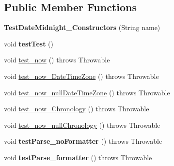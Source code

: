\subsection*{Public Member Functions}
\begin{DoxyCompactItemize}
\item 
\hypertarget{classorg_1_1joda_1_1time_1_1_test_date_midnight___constructors_a6449ea2c77ab4e7d8cbd9c25c146fb81}{{\bfseries Test\-Date\-Midnight\-\_\-\-Constructors} (String name)}\label{classorg_1_1joda_1_1time_1_1_test_date_midnight___constructors_a6449ea2c77ab4e7d8cbd9c25c146fb81}

\item 
\hypertarget{classorg_1_1joda_1_1time_1_1_test_date_midnight___constructors_ab89e65577a08456df32a58e4eb211a2d}{void {\bfseries test\-Test} ()}\label{classorg_1_1joda_1_1time_1_1_test_date_midnight___constructors_ab89e65577a08456df32a58e4eb211a2d}

\item 
void \hyperlink{classorg_1_1joda_1_1time_1_1_test_date_midnight___constructors_ae6c970f78e4b58bfa515afb75dac4915}{test\-\_\-now} ()  throws Throwable 
\item 
void \hyperlink{classorg_1_1joda_1_1time_1_1_test_date_midnight___constructors_aa483adf5d0edd0f1043002c55804356d}{test\-\_\-now\-\_\-\-Date\-Time\-Zone} ()  throws Throwable 
\item 
void \hyperlink{classorg_1_1joda_1_1time_1_1_test_date_midnight___constructors_a1016d7ee89a145d622e66fa7ff838ea9}{test\-\_\-now\-\_\-null\-Date\-Time\-Zone} ()  throws Throwable 
\item 
void \hyperlink{classorg_1_1joda_1_1time_1_1_test_date_midnight___constructors_a86f0c1fc793c638ec571fe6dd56b713e}{test\-\_\-now\-\_\-\-Chronology} ()  throws Throwable 
\item 
void \hyperlink{classorg_1_1joda_1_1time_1_1_test_date_midnight___constructors_a7d8040aec6aea9bd1ed97e7bffaa844d}{test\-\_\-now\-\_\-null\-Chronology} ()  throws Throwable 
\item 
\hypertarget{classorg_1_1joda_1_1time_1_1_test_date_midnight___constructors_af35d9dd97cafff3b9bcb3104c26d04cb}{void {\bfseries test\-Parse\-\_\-no\-Formatter} ()  throws Throwable }\label{classorg_1_1joda_1_1time_1_1_test_date_midnight___constructors_af35d9dd97cafff3b9bcb3104c26d04cb}

\item 
\hypertarget{classorg_1_1joda_1_1time_1_1_test_date_midnight___constructors_a2b05b929e53d0463dfa15294f37a8060}{void {\bfseries test\-Parse\-\_\-formatter} ()  throws Throwable }\label{classorg_1_1joda_1_1time_1_1_test_date_midnight___constructors_a2b05b929e53d0463dfa15294f37a8060}


\end{DoxyCompactItemize}
